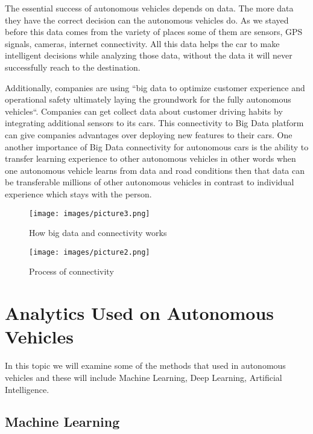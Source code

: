 \documentclass[sigconf]{acmart}
\begin{document}
\par The essential success of autonomous vehicles depends on data. The more data they have the correct decision can the autonomous vehicles do. As we stayed before this data comes from the variety of places some of them are sensors, GPS signals, cameras, internet connectivity. All this data helps the car to make intelligent decisions while analyzing those data, without the data it will never successfully reach to the destination.\cite{www-kdnuggets}

\par Additionally, companies are using ``big data to optimize customer experience and operational safety ultimately laying the groundwork for the fully autonomous vehicles``.\cite{www-webo} Companies can get collect data about customer driving habits by integrating additional sensors to its cars.\cite{www-hb.org} This connectivity to Big Data platform can give companies advantages over deploying new features to their cars. One another importance of Big Data connectivity for autonomous cars is the ability to transfer learning experience to other autonomous vehicles in other words when one autonomous vehicle learns from data and road conditions then that data can be transferable millions of other autonomous vehicles in contrast to individual experience which stays with the person. \cite{www-hb.org}

\begin{figure}[!ht]
  \centering
      \texttt{[image: images/picture3.png]}
  \caption{How big data and connectivity works}\label{F:connectivity}
\end{figure}

\begin{figure}[!ht]
  \centering
      \texttt{[image: images/picture2.png]}
  \caption{Process of connectivity}\label{fig:hbsconnectivitysteps}
\end{figure}


\section{Analytics Used on Autonomous Vehicles}
In this topic we will examine some of the methods that used in autonomous vehicles and these will include Machine Learning, Deep Learning, Artificial Intelligence.


\subsection{Machine Learning}
\end{document}
